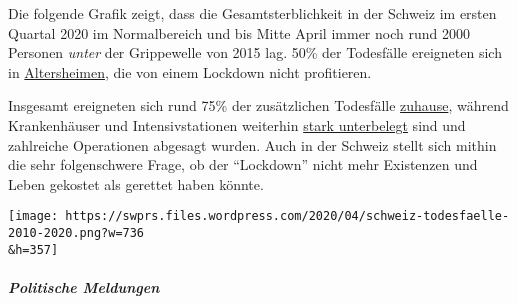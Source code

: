 Die folgende Grafik zeigt, dass die Gesamtsterblichkeit in der Schweiz
im ersten Quartal 2020 im Normalbereich und bis Mitte April immer noch
rund 2000 Personen \emph{unter} der Grippewelle von 2015 lag. 50\% der
Todesfälle ereigneten sich in
\href{https://www.nzz.ch/zuerich/coronavirus-zuerich-aendert-nun-das-testregime-in-heimenauch-viele-aeltere-covid-19-infizierte-entwickeln-keine-symptome-zuerich-aendert-nun-das-testregime-in-heimen-ld.1552089}{Altersheimen},
die von einem Lockdown nicht profitieren.

Insgesamt ereigneten sich rund 75\% der zusätzlichen Todesfälle
\href{https://www.tagesspiegel.de/wissen/woran-sterben-corona-patienten-wirklich-ein-schweizer-forscher-macht-hoffnung-im-kampf-gegen-covid-19/25750666.html}{zuhause},
während Krankenhäuser und Intensivstationen weiterhin
\href{https://swprs.files.wordpress.com/2020/04/intensivbettenbelegung-schweiz-2020-04-14.png}{stark
unterbelegt} sind und zahlreiche Operationen abgesagt wurden. Auch in
der Schweiz stellt sich mithin die sehr folgenschwere Frage, ob der
``Lockdown'' nicht mehr Existenzen und Leben gekostet als gerettet haben
könnte.

\texttt{[image: https://swprs.files.wordpress.com/2020/04/schweiz-todesfaelle-2010-2020.png?w=736\\\&h=357]}

\hypertarget{politische-meldungen}{%
\subparagraph{\texorpdfstring{\textbf{Politische
Meldungen}}{Politische Meldungen}}\label{politische-meldungen}}

